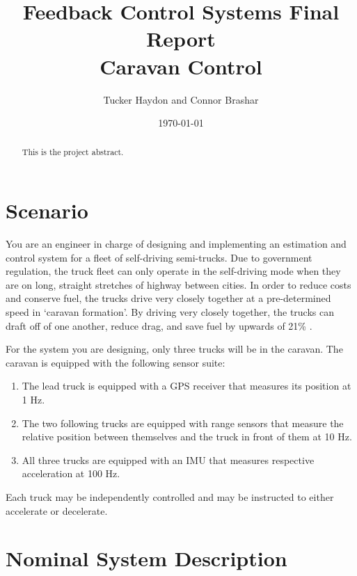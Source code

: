 \documentclass[12pt,onecolumn,reqno]{amsart}
\begin{document}
\title[]{Feedback Control Systems Final Report \\ Caravan Control}
\author[]{Tucker Haydon and Connor Brashar}
\address{The University of Texas at Austin}
\date{\today}
\begin{abstract}
  This is the project abstract.
\end{abstract}
\maketitle


\section{Scenario}
You are an engineer in charge of designing and implementing an estimation and
control system for a fleet of self-driving semi-trucks. Due to government
regulation, the truck fleet can only operate in the self-driving mode when they
are on long, straight stretches of highway between cities. In order to reduce
costs and conserve fuel, the trucks drive very closely together at a
pre-determined speed in `caravan formation'. By driving very closely together,
the trucks can draft off of one another, reduce drag, and save fuel by upwards
of 21\% \cite{bonnet2000fuel}.

For the system you are designing, only three trucks will be in the caravan. The
caravan is equipped with the following sensor suite: 
\begin{enumerate}
  \item The lead truck is equipped with a GPS receiver that measures its
    position at 1 Hz.
  \item The two following trucks are equipped with range sensors that measure
    the relative position between themselves and the truck in front of them at
    10 Hz.
  \item All three trucks are equipped with an IMU that measures respective
    acceleration at 100 Hz.
\end{enumerate}

Each truck may be independently controlled and may be instructed to either
accelerate or decelerate.

\section{Nominal System Description}
\label{sec:nominal_system}
\end{document}
